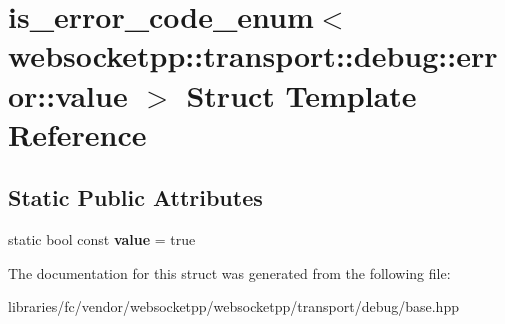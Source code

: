 \hypertarget{structis__error__code__enum_3_01websocketpp_1_1transport_1_1debug_1_1error_1_1value_01_4}{}\section{is\+\_\+error\+\_\+code\+\_\+enum$<$ websocketpp\+:\+:transport\+:\+:debug\+:\+:error\+:\+:value $>$ Struct Template Reference}
\label{structis__error__code__enum_3_01websocketpp_1_1transport_1_1debug_1_1error_1_1value_01_4}
\subsection*{Static Public Attributes}
\begin{DoxyCompactItemize}
\item 
\mbox{\label{structis__error__code__enum_3_01websocketpp_1_1transport_1_1debug_1_1error_1_1value_01_4_a9e78f2635c2c354c3e5b479cdcdc2f0b}} 
static bool const {\bfseries value} = true
\end{DoxyCompactItemize}


The documentation for this struct was generated from the following file\+:\begin{DoxyCompactItemize}
\item 
libraries/fc/vendor/websocketpp/websocketpp/transport/debug/base.\+hpp\end{DoxyCompactItemize}
